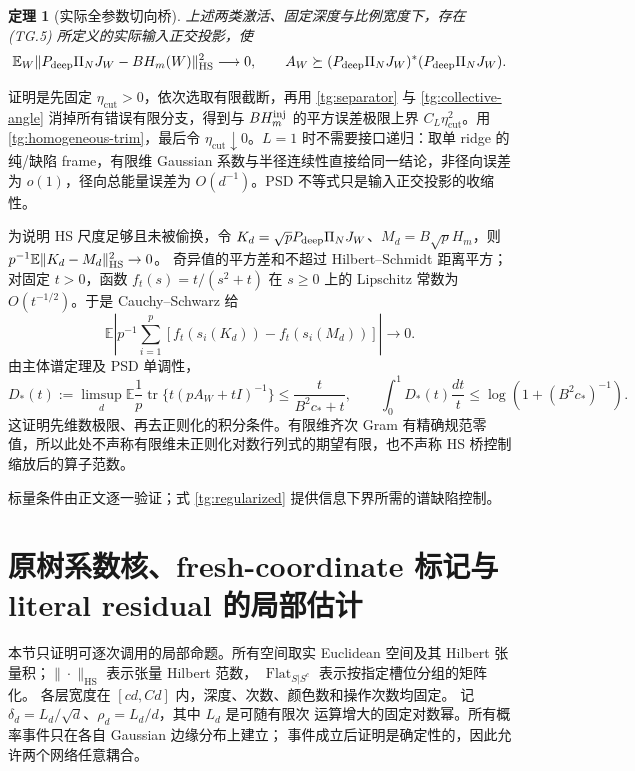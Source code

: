 \documentclass[a4paper]{tufte-handout}
\newtheorem{theorem}{定理}
\newcommand{\ecut}{\eta_{\mathrm{cut}}}
\begin{document}
\begin{fullwidth}
\begin{theorem}[实际全参数切向桥]\label{tg:actual-bridge}
上述两类激活、固定深度与比例宽度下，存在 (TG.5) 所定义的实际输入正交投影，使
\[
 \mathbb E_W\|P_{\rm deep}\Pi_NJ_W-BH_m(W)\|_{\rm HS}^2\longrightarrow0,
 \qquad A_W\succeq(P_{\rm deep}\Pi_NJ_W)^*(P_{\rm deep}\Pi_NJ_W).
\]
\end{theorem}
证明是先固定 $\ecut>0$，依次选取有限截断，再用 \eqref{tg:separator} 与 \eqref{tg:collective-angle} 消掉所有错误有限分支，得到与 $BH_m^{\rm inj}$ 的平方误差极限上界 $C_L\ecut^2$。用 \eqref{tg:homogeneous-trim}，最后令 $\ecut\downarrow0$。$L=1$ 时不需要接口递归：取单 ridge 的纯/缺陷 frame，有限维 Gaussian 系数与半径连续性直接给同一结论，非径向误差为 $o(1)$，径向总能量误差为 $O(d^{-1})$。PSD 不等式只是输入正交投影的收缩性。

为说明 HS 尺度足够且未被偷换，令 $K_d=\sqrt pP_{\rm deep}\Pi_NJ_W$、$M_d=B\sqrt pH_m$，则
$p^{-1}\mathbb E\|K_d-M_d\|_{\rm HS}^2\to0$。
奇异值的平方差和不超过 Hilbert--Schmidt 距离平方；对固定 $t>0$，函数
$f_t(s)=t/(s^2+t)$ 在 $s\ge0$ 上的 Lipschitz 常数为 $O(t^{-1/2})$。于是 Cauchy--Schwarz 给
\[
 \mathbb E\left|p^{-1}\sum_{i=1}^p[f_t(s_i(K_d))-f_t(s_i(M_d))]\right|\longrightarrow0.
\]
由主体谱定理及 PSD 单调性，
\begin{equation}\label{tg:regularized}
 D_*(t):=\limsup_d\mathbb E\frac1p\operatorname{tr}\{t(pA_W+tI)^{-1}\}
 \le\frac{t}{B^2c_*+t},\qquad
 \int_0^1D_*(t)\frac{dt}{t}\le\log(1+(B^2c_*)^{-1}).
\end{equation}
这证明先维数极限、再去正则化的积分条件。有限维齐次 Gram 有精确规范零值，所以此处不声称有限维未正则化对数行列式的期望有限，也不声称 HS 桥控制缩放后的算子范数。

标量条件由正文逐一验证；式 \eqref{tg:regularized} 提供信息下界所需的谱缺陷控制。

\section{原树系数核、fresh-coordinate 标记与 literal residual 的局部估计}
\label{fp:core-section}

本节只证明可逐次调用的局部命题。所有空间取实 Euclidean 空间及其 Hilbert
张量积；$\|\cdot\|_{\mathrm{HS}}$ 表示张量 Hilbert 范数，
$\operatorname{Flat}_{S|S^c}$ 表示按指定槽位分组的矩阵化。
各层宽度在 $[c d,Cd]$ 内，深度、次数、颜色数和操作次数均固定。
记 $\delta_d=L_d/\sqrt d$、$\rho_d=L_d/d$，其中 $L_d$ 是可随有限次
运算增大的固定对数幂。所有概率事件只在各自 Gaussian 边缘分布上建立；
事件成立后证明是确定性的，因此允许两个网络任意耦合。


\end{fullwidth}
\end{document}
